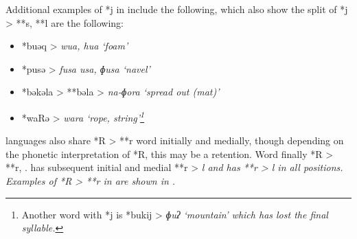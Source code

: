 Additional examples of *j in  include the following,
which also show the split of *j > **s, **l are the following:

\begin{itemize}
	\item *buəq >  \it{wua}, \it{hua} ‘foam’
	\item	*pusə >  \it{fusa}
				 \it{usa},  \it{ɸusa} ‘navel’
	\item	*bəkəla > **bəla > 
				\it{na-ɸora} ‘spread out (mat)’
	\item	*waRə >  \it{wara} ‘rope,
				string’\footnote{
						Another word with *j is *bukij > 
						\it{ɸuʔ} ‘mountain’ which has lost the final syllable.}
\end{itemize}

 languages also share *R > **r word initially
and medially, though depending on the phonetic interpretation
of *R, this may be a retention.
Word finally *R > **r, {\0}.
 has subsequent initial
and medial **r > \it{l}
and  has **r > \it{l} in all positions.
Examples of *R > **r in  are shown in .

